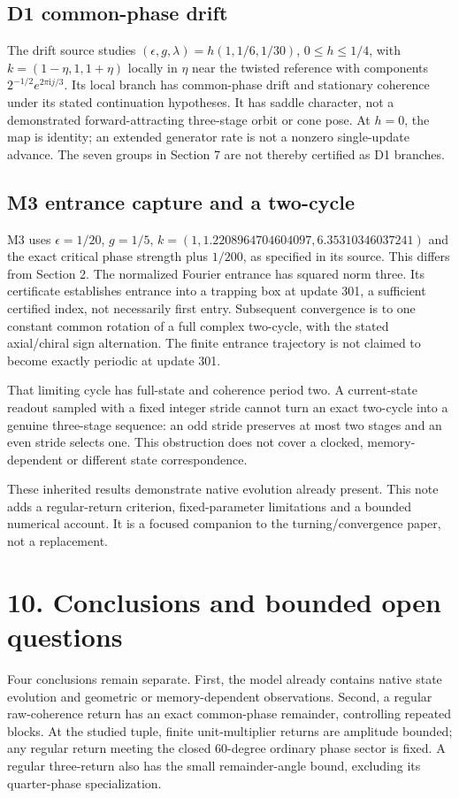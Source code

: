 \documentclass[11pt,a4paper]{article}
\begin{document}
\subsection*{D1 common-phase drift}
The drift source studies $(\epsilon,g,\lambda)=h(1,1/6,1/30)$, $0\leq h\leq1/4$, with $k=(1-\eta,1,1+\eta)$ locally in $\eta$ near the twisted reference with components $2^{-1/2}e^{2\pi\mathrm{i}j/3}$. Its local branch has common-phase drift and stationary coherence under its stated continuation hypotheses. It has saddle character, not a demonstrated forward-attracting three-stage orbit or cone pose. At $h=0$, the map is identity; an extended generator rate is not a nonzero single-update advance. The seven groups in Section 7 are not thereby certified as D1 branches. \cite{D1}

\subsection*{M3 entrance capture and a two-cycle}
M3 uses $\epsilon=1/20$, $g=1/5$, $k=(1,1.2208964704604097,6.35310346037241)$ and the exact critical phase strength plus $1/200$, as specified in its source. This differs from Section 2. The normalized Fourier entrance has squared norm three. Its certificate establishes entrance into a trapping box at update 301, a sufficient certified index, not necessarily first entry. Subsequent convergence is to one constant common rotation of a full complex two-cycle, with the stated axial/chiral sign alternation. The finite entrance trajectory is not claimed to become exactly periodic at update 301. \cite{M3}

That limiting cycle has full-state and coherence period two. A current-state readout sampled with a fixed integer stride cannot turn an exact two-cycle into a genuine three-stage sequence: an odd stride preserves at most two stages and an even stride selects one. This obstruction does not cover a clocked, memory-dependent or different state correspondence.

These inherited results demonstrate native evolution already present. This note adds a regular-return criterion, fixed-parameter limitations and a bounded numerical account. It is a focused companion to the turning/convergence paper, not a replacement.

\clearpage
\section*{10. Conclusions and bounded open questions}
Four conclusions remain separate. First, the model already contains native state evolution and geometric or memory-dependent observations. Second, a regular raw-coherence return has an exact common-phase remainder, controlling repeated blocks. At the studied tuple, finite unit-multiplier returns are amplitude bounded; any regular return meeting the closed 60-degree ordinary phase sector is fixed. A regular three-return also has the small remainder-angle bound, excluding its quarter-phase specialization.
\end{document}
